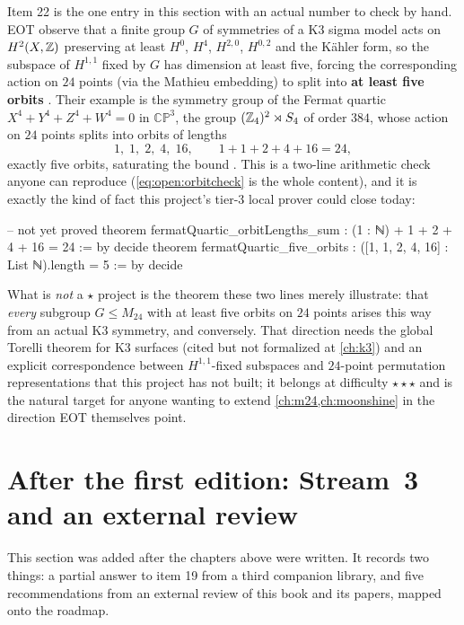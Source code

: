 Item 22 is the one entry in this section with an actual number to check by hand. EOT
observe that a finite group $G$ of symmetries of a K3 sigma model acts on $H^2(X,\mathbb{Z})$
preserving at least $H^0$, $H^4$, $H^{2,0}$, $H^{0,2}$ and the K\"ahler form, so the
subspace of $H^{1,1}$ fixed by $G$ has dimension at least five, forcing the corresponding
action on $24$ points (via the Mathieu embedding) to split into \textbf{at least five
orbits} . Their example is the
symmetry group of the Fermat quartic $X^4+Y^4+Z^4+W^4=0$ in $\mathbb{CP}^3$, the group
$(\mathbb{Z}_4)^2\rtimes S_4$ of order $384$, whose action on $24$ points splits into orbits of
lengths
\begin{equation}\label{eq:open:orbitcheck}
  1,\;1,\;2,\;4,\;16,\qquad 1+1+2+4+16=24,
\end{equation}
exactly five orbits, saturating the bound . This is a two-line
arithmetic check anyone can reproduce (\cref{eq:open:orbitcheck} is the whole content), and
it is exactly the kind of fact this project's tier-3 local prover could close today:
\begin{leancode}
-- not yet proved
theorem fermatQuartic_orbitLengths_sum :
    (1 : ℕ) + 1 + 2 + 4 + 16 = 24 := by decide
theorem fermatQuartic_five_orbits :
    ([1, 1, 2, 4, 16] : List ℕ).length = 5 := by decide
\end{leancode}
What is \emph{not} a $\star$ project is the theorem these two lines merely illustrate: that
\emph{every} subgroup $G\le M_{24}$ with at least five orbits on $24$ points arises this
way from an actual K3 symmetry, and conversely. That direction needs the global Torelli
theorem for K3 surfaces (cited but not formalized at \cref{ch:k3}) and an explicit
correspondence between $H^{1,1}$-fixed subspaces and $24$-point permutation
representations that this project has not built; it belongs at difficulty $\star\star\star$
and is the natural target for anyone wanting to extend \cref{ch:m24,ch:moonshine} in the
direction EOT themselves point.

\section{After the first edition: Stream~3 and an external review}\label{sec:open:after}

This section was added after the chapters above were written. It records two things: a partial
answer to item 19 from a third companion library, and five recommendations from an external review of
this book and its papers, mapped onto the roadmap.

